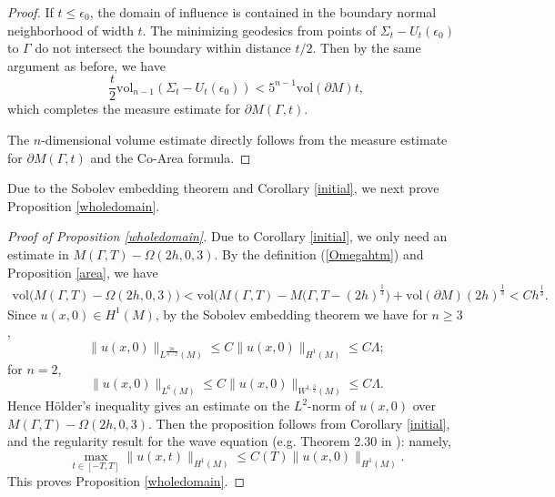 \documentclass[11pt,letterpaper]{amsart}
\numberwithin{equation}{section}
\theoremstyle{definition}
\theoremstyle{plain}
\theoremstyle{definition}
\theoremstyle{plain}
\theoremstyle{definition}
\theoremstyle{plain}
\newcommand{\vol}{\textrm{vol}}
\begin{document}
\begin{proof}
If $t\leqslant \epsilon_0$, the domain of influence is contained in the boundary normal neighborhood of width $t$. The minimizing geodesics from points of $\Sigma_t-U_t(\epsilon_0)$ to $\Gamma$ do not intersect the boundary within distance $t/2$. Then by the same argument as before, we have
$$\frac{t}{2} \vol_{n-1}(\Sigma_t-U_t(\epsilon_0))< 5^{n-1}\vol(\partial M)t,$$
which completes the measure estimate for $\partial M(\Gamma,t)$. 

The $n$-dimensional volume estimate directly follows from the measure estimate for $\partial M(\Gamma,t)$ and the Co-Area formula.
\end{proof}

Due to the Sobolev embedding theorem and Corollary \ref{initial}, we next prove Proposition \ref{wholedomain}.

\begin{proof}[Proof of Proposition \ref{wholedomain}]
Due to Corollary \ref{initial}, we only need an estimate in $M(\Gamma,T)-\Omega(2h,0,3)$. By the definition (\ref{Omegahtm}) and Proposition \ref{area}, we have
\begin{eqnarray*}
\vol\big(M(\Gamma,T)-\Omega(2h,0,3)\big)<\vol\big(M(\Gamma,T)-M(\Gamma,T-(2h)^{\frac{1}{3}}\big)+\vol(\partial M)(2h)^{\frac{1}{3}} < C h^{\frac{1}{3}}.
\end{eqnarray*}
Since $u(x,0)\in H^1(M)$, by the Sobolev embedding theorem we have for $n\geqslant 3$,
$$\|u(x,0)\|_{L^{\frac{2n}{n-2}}(M)}\leqslant C\|u(x,0)\|_{H^1(M)}\leqslant C\Lambda;$$
for $n=2$,
$$\|u(x,0)\|_{L^6(M)}\leqslant C\|u(x,0)\|_{W^{1,\frac{3}{2}}(M)}\leqslant C\Lambda.$$
Hence H\"older's inequality gives an estimate on the $L^2$-norm of $u(x,0)$ over $M(\Gamma,T)-\Omega(2h,0,3)$.
Then the proposition follows from Corollary \ref{initial}, and the regularity result for the wave equation (e.g. Theorem 2.30 in \cite{KKL}): namely,
$$\max_{t\in [-T,T]}\|u(x,t)\|_{H^1(M)}\leqslant C(T) \|u(x,0)\|_{H^1(M)}.$$
This proves Proposition \ref{wholedomain}.
\end{proof}
\end{document}
